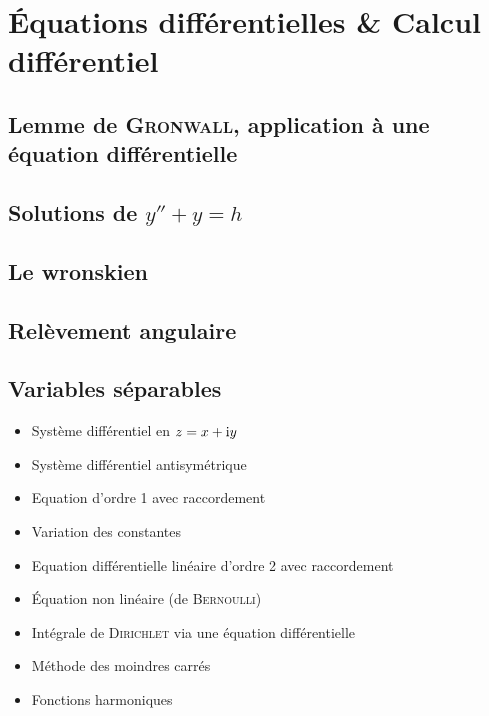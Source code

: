 \chapter{Équations différentielles \& Calcul différentiel }


\section{Lemme de \textsc{Gronwall}, application à une équation différentielle}


\section{Solutions de $y'' + y = h$}


\section{Le wronskien}


\section{Relèvement angulaire}


\section{Variables séparables}


\begin{itemize}
    \item Système différentiel en $z = x + \mathrm{i} y$
    \item Système différentiel antisymétrique
    \item Equation d'ordre 1 avec raccordement
    \item Variation des constantes
    \item Equation différentielle linéaire d'ordre 2 avec raccordement
    \item Équation non linéaire (de \textsc{Bernoulli})
    \item Intégrale de \textsc{Dirichlet} via une équation différentielle
    \item Méthode des moindres carrés
    \item Fonctions harmoniques
\end{itemize}